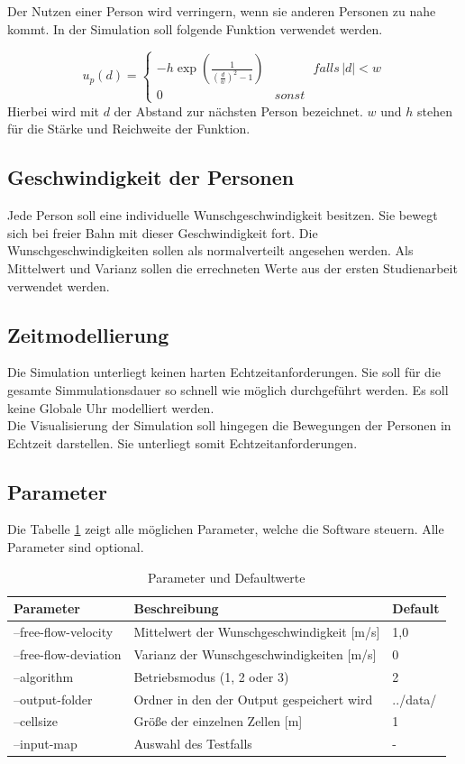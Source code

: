 Der Nutzen einer Person wird verringern, wenn sie anderen Personen zu nahe kommt. In der Simulation soll folgende Funktion verwendet werden. 

\begin{displaymath}
u_{p}(d) = 
\left\{ 
\begin{array}{cc}
-h \exp(\frac{1}{(\frac{d}{w})^2 -1}) & \;\;\;\;\;\;\;\;\;\;\; falls\, |d| < w  \\
0 & sonst  
\end{array} 
\right.
\end{displaymath}
Hierbei wird mit $d$ der Abstand zur nächsten Person bezeichnet. $w$ und $h$ stehen für die Stärke und Reichweite der Funktion. 
 
\subsection{Geschwindigkeit der Personen}
Jede Person soll eine individuelle Wunschgeschwindigkeit besitzen. Sie bewegt sich bei freier Bahn mit dieser Geschwindigkeit fort. Die Wunschgeschwindigkeiten sollen als normalverteilt angesehen werden. Als Mittelwert und Varianz sollen die errechneten Werte aus der ersten Studienarbeit verwendet werden.

\subsection{Zeitmodellierung}
Die Simulation unterliegt keinen harten Echtzeitanforderungen. Sie soll für die gesamte Simmulationsdauer so schnell wie möglich durchgeführt werden. Es soll keine Globale Uhr modelliert werden. \\
Die Visualisierung der Simulation soll hingegen die Bewegungen der Personen in Echtzeit darstellen. Sie unterliegt somit Echtzeitanforderungen.

\subsection{Parameter}
Die Tabelle \ref{tab:parameter} zeigt alle möglichen Parameter, welche die Software steuern. Alle Parameter sind optional.
\begin{table}[htpb]
	\centering
	\begin{tabular}{lll}
		Parameter & Beschreibung  &  Default\\ \hline
		--free-flow-velocity & Mittelwert der Wunschgeschwindigkeit [m/s] & 1,0 \\
		--free-flow-deviation & Varianz der Wunschgeschwindigkeiten [m/s] & 0 \\
		--algorithm & Betriebsmodus (1, 2 oder 3) & 2 \\
		--output-folder & Ordner in den der Output gespeichert wird & ../data/ \\
		--cellsize & Größe der einzelnen Zellen [m] & 1 \\
		--input-map & Auswahl des Testfalls & - \\
		
	\end{tabular}
	\caption{Parameter und Defaultwerte}
	\label{tab:parameter}
\end{table}
	
